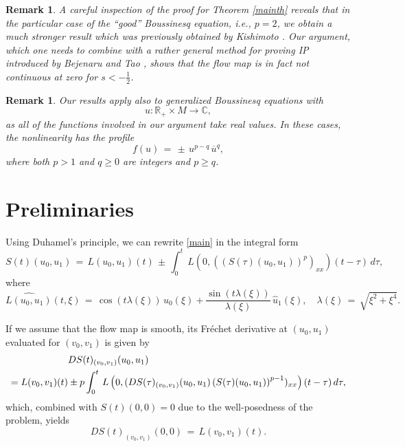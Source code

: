 \documentclass{amsart}
\newtheorem{remark}[theorem]{Remark}
\begin{document}
\begin{remark}
A careful inspection of the proof for Theorem \ref{mainth} reveals that in the particular case of the ``good'' Boussinesq equation, i.e., $p=2$, we obtain a much stronger result which was previously obtained by Kishimoto \cite{K12}. Our argument, which one needs to combine with a rather general method for proving IP introduced by Bejenaru and Tao \cite{BT06}, shows that the flow map is in fact not continuous at zero for $s<-\frac 12$.
\end{remark}

\begin{remark}
Our results apply also to generalized Boussinesq equations with
\[
u: \mathbb{R}_+\times M \to \mathbb{C},
\]
as all of the functions involved in our argument take real values. In these cases, the nonlinearity has the profile
\[
f(u)\,=\,\pm\,u^{p-q}\,\overline{u}^q,
\]
where both $p>1$ and $q\geq 0$ are integers and $p\geq q$. 
\end{remark}


\section{Preliminaries}
Using Duhamel's principle, we can rewrite \eqref{main} in the integral form
\begin{equation}
S(t)(u_0,u_1)\,=\,L(u_0,u_1)(t)\,\pm\, \int_0^t\,L \left( 0,\left((S(\tau)(u_0,u_1))^p\right)_{xx}\right)(t-\tau)\,d\tau,
\end{equation}
where
\begin{equation}
\widehat{L(u_0,u_1)}(t,\xi)\,=\,\cos(t \lambda(\xi))\, \widehat{u}_0(\xi)+\frac{\sin(t \lambda(\xi))}{\lambda(\xi)} \,\widehat{u}_1(\xi), \quad \lambda(\xi)\,=\,\sqrt{\xi^2+\xi^4}.
\label{L}
\end{equation}

If we assume that the flow map is smooth, its Fr\'{e}chet derivative at $(u_0,u_1)$ evaluated for $(v_0,v_1)$ is given by
\begin{equation}
\aligned
&DS(t)_{(v_0,v_1)}(u_0,u_1)\\
=L(v_0,v_1)(t)
&\pm p\int_0^t\,L \left( 0,(DS(\tau)_{(v_0,v_1)}(u_0,u_1)\left(S(\tau)(u_0,u_1)\right)^{p-1})_{xx}\right)(t-\tau)\,d\tau,
\endaligned\label{ds}
\end{equation}
which, combined with $S(t)(0,0)=0$ due to the well-posedness of the problem, yields
\begin{equation}
DS(t)_{(v_0,v_1)}(0,0)\,=\,L(v_0,v_1)(t).
\label{ds0}
\end{equation} 
\end{document}
